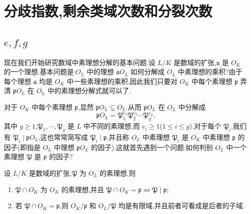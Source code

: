 \section{分歧指数,剩余类域次数和分裂次数}\label{sec:ch2-s2}

\subsection{\texorpdfstring{$e, f, g$}{e, f, g}}\label{sec:ch2-s2-1}

现在我们开始研究数域中素理想分解的基本问题.设 $L/K$ 是数域的扩张,$\mathfrak{a}$ 是 $O_K$ 的一个理想.基本问题是:$O_L$ 中的理想 $\mathfrak{a}O_L$ 如何分解成 $O_L$ 中素理想的乘积?由于每个理想 $\mathfrak{a}$ 均是 $O_K$ 中一些素理想的乘积,因此我们只要对 $O_K$ 中每个素理想 $\mathfrak{p}$ 弄清 $\mathfrak{p}O_L$ 在 $O_L$ 中的素理想分解式就可以了.

对于 $O_K$ 中每个素理想 $\mathfrak{p}$,显然 $\mathfrak{p}O_L\subsetneq O_L$.从而 $\mathfrak{p}O_L$ 在 $O_L$ 中分解成
\[
  \mathfrak{p}O_L=\mathfrak{P}_1^{e_1}\mathfrak{P}_2^{e_2}\cdots\mathfrak{P}_g^{e_g},
\]
其中 $g\geqslant 1$,$\mathfrak{P}_1,\cdots,\mathfrak{P}_g$ 是 $L$ 中不同的素理想,而 $e_i\geqslant 1$($1\leqslant i\leqslant g$).对于每个 $\mathfrak{P}_i$,我们有 $\mathfrak{P}_i\mid\mathfrak{p}O_L$,这也常常简写成 $\mathfrak{P}_i\mid\mathfrak{p}$,并且称 $O_L$ 中素理想 $\mathfrak{P}_i$ 是 $O_K$ 中素理想 $\mathfrak{p}$ 的因子(即指是 $O_L$ 中理想 $\mathfrak{p}O_L$ 的因子).这就首先遇到一个问题:如何判别 $O_L$ 中一个素理想 $\mathfrak{P}$ 是 $\mathfrak{p}$ 的因子?

\begin{lemma}\label{lem:ch2-10}
设 $L/K$ 是数域的扩张,$\mathfrak{P}$ 为 $O_L$ 的素理想,则
\begin{enumerate}[(1)]
  \item $\mathfrak{P}\cap O_K$ 为 $O_K$ 的素理想,并且 $\mathfrak{P}\cap O_K=\mathfrak{p}\Leftrightarrow\mathfrak{P}\mid\mathfrak{p}$;
  \item 若 $\mathfrak{P}\cap O_K=\mathfrak{p}$,则 $O_K/\mathfrak{p}$ 和 $O_L/\mathfrak{P}$ 均是有限域,并且前者可看成是后者的子域.
\end{enumerate}
\end{lemma}

